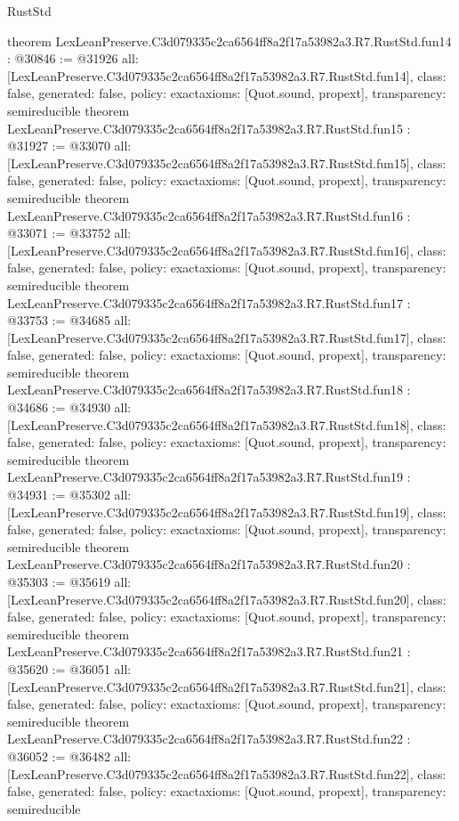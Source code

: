 \begin{lexlean}{RustStd}
\begin{coremodule}
{}
theorem LexLeanPreserve.C3d079335c2ca6564ff8a2f17a53982a3.R7.RustStd.fun14 : @30846 := @31926 {
  all: [LexLeanPreserve.C3d079335c2ca6564ff8a2f17a53982a3.R7.RustStd.fun14],
  class: false,
  generated: false,
  policy: exact{axioms: [Quot.sound, propext]},
  transparency: semireducible
}
theorem LexLeanPreserve.C3d079335c2ca6564ff8a2f17a53982a3.R7.RustStd.fun15 : @31927 := @33070 {
  all: [LexLeanPreserve.C3d079335c2ca6564ff8a2f17a53982a3.R7.RustStd.fun15],
  class: false,
  generated: false,
  policy: exact{axioms: [Quot.sound, propext]},
  transparency: semireducible
}
theorem LexLeanPreserve.C3d079335c2ca6564ff8a2f17a53982a3.R7.RustStd.fun16 : @33071 := @33752 {
  all: [LexLeanPreserve.C3d079335c2ca6564ff8a2f17a53982a3.R7.RustStd.fun16],
  class: false,
  generated: false,
  policy: exact{axioms: [Quot.sound, propext]},
  transparency: semireducible
}
theorem LexLeanPreserve.C3d079335c2ca6564ff8a2f17a53982a3.R7.RustStd.fun17 : @33753 := @34685 {
  all: [LexLeanPreserve.C3d079335c2ca6564ff8a2f17a53982a3.R7.RustStd.fun17],
  class: false,
  generated: false,
  policy: exact{axioms: [Quot.sound, propext]},
  transparency: semireducible
}
theorem LexLeanPreserve.C3d079335c2ca6564ff8a2f17a53982a3.R7.RustStd.fun18 : @34686 := @34930 {
  all: [LexLeanPreserve.C3d079335c2ca6564ff8a2f17a53982a3.R7.RustStd.fun18],
  class: false,
  generated: false,
  policy: exact{axioms: [Quot.sound, propext]},
  transparency: semireducible
}
theorem LexLeanPreserve.C3d079335c2ca6564ff8a2f17a53982a3.R7.RustStd.fun19 : @34931 := @35302 {
  all: [LexLeanPreserve.C3d079335c2ca6564ff8a2f17a53982a3.R7.RustStd.fun19],
  class: false,
  generated: false,
  policy: exact{axioms: [Quot.sound, propext]},
  transparency: semireducible
}
theorem LexLeanPreserve.C3d079335c2ca6564ff8a2f17a53982a3.R7.RustStd.fun20 : @35303 := @35619 {
  all: [LexLeanPreserve.C3d079335c2ca6564ff8a2f17a53982a3.R7.RustStd.fun20],
  class: false,
  generated: false,
  policy: exact{axioms: [Quot.sound, propext]},
  transparency: semireducible
}
theorem LexLeanPreserve.C3d079335c2ca6564ff8a2f17a53982a3.R7.RustStd.fun21 : @35620 := @36051 {
  all: [LexLeanPreserve.C3d079335c2ca6564ff8a2f17a53982a3.R7.RustStd.fun21],
  class: false,
  generated: false,
  policy: exact{axioms: [Quot.sound, propext]},
  transparency: semireducible
}
theorem LexLeanPreserve.C3d079335c2ca6564ff8a2f17a53982a3.R7.RustStd.fun22 : @36052 := @36482 {
  all: [LexLeanPreserve.C3d079335c2ca6564ff8a2f17a53982a3.R7.RustStd.fun22],
  class: false,
  generated: false,
  policy: exact{axioms: [Quot.sound, propext]},
  transparency: semireducible
}
\end{coremodule}
\end{lexlean}
